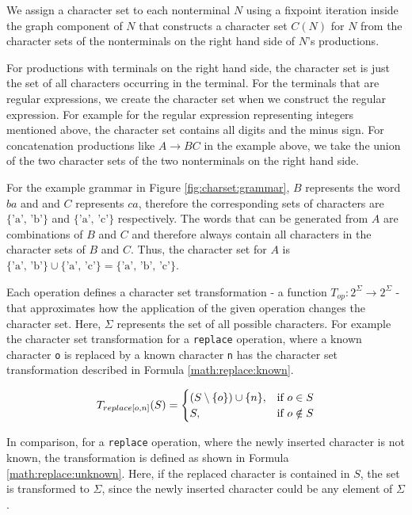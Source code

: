 We assign a character set to each nonterminal $N$ using a fixpoint iteration inside the graph component of $N$ that constructs a character set $C(N)$ for $N$ from the character sets of the nonterminals on the right hand side of $N$'s productions.

For productions with terminals on the right hand side, the character set is just the set of all characters occurring in the terminal. For the terminals that are regular expressions, we create the character set when we construct the regular expression. For example for the regular expression representing integers mentioned above, the character set contains all digits and the minus sign.
For concatenation productions like $A \rightarrow BC$ in the example above, we take the union of the two character sets of the two nonterminals on the right hand side.

For the example grammar in Figure \ref{fig:charset:grammar}, $B$ represents the word $ba$ and and $C$ represents $ca$, therefore the corresponding sets of characters are  $\{\text{'a', 'b'}\}$ and  $\{\text{'a', 'c'}\}$ respectively. The words that can be generated from $A$ are combinations of $B$ and $C$ and therefore always contain all characters in the character sets of $B$ and $C$. Thus, the character set for $A$ is $\{\text{'a', 'b'}\} \cup \{\text{'a', 'c'}\} = \{\text{'a', 'b', 'c'}\}$.

Each operation defines a character set transformation - a function $T_{op} : 2^\Sigma \rightarrow 2^\Sigma$ - that approximates how the application of the given operation changes the character set. Here, $\Sigma$ represents the set of all possible characters.
For example the character set transformation for a \lstinline|replace| operation, where a known character \lstinline|o| is replaced by a known character \lstinline|n| has the character set transformation described in Formula \ref{math:replace:known}.

\begin{align}
	\centering
	T_{replace[o, n]}(S) = 
	\begin{cases}
		(S \setminus \{o\}) \cup \{n\}, & \text{if } o \in S\\
		S, & \text{if } o \notin S
	\end{cases}
	\label{math:replace:known}
\end{align}

In comparison, for a \lstinline|replace| operation, where the newly inserted character is not known, the transformation is defined as shown in Formula \ref{math:replace:unknown}. Here, if the replaced character is contained in $S$, the set is transformed to $\Sigma$, since the newly inserted character could be any element of $\Sigma$.

